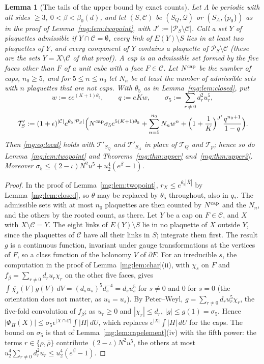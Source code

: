 \documentclass[11pt,a4paper]{article}
\newtheorem{lemma}[theorem]{Lemma}
\theoremstyle{definition}
\theoremstyle{remark}
\newcommand{\cP}{\mathcal{P}}
\newcommand{\dU}{\,dU}
\begin{document}
\begin{lemma}[The tails of the upper bound by exact counts]\label{mg:lem:uppertails}
Let $\Lambda$ be periodic with all sides $\ge3$, $0<\beta<\beta_0(d)$, and let $(S,\mathcal C)$ be $(S_Q,\mathcal Q)$ or $(S_A,\{p_0\})$ as in the proof of Lemma~\ref{mg:lem:twopoint}, with
$J':=|\cP_S\setminus\mathcal C|$. Call a set $Y$ of plaquettes \emph{admissible} if $Y\cap\mathcal C=\emptyset$, every link of $E(Y)\setminus S$ lies in at least two plaquettes of $Y$, and every
component of $Y$ contains a plaquette of $\cP_S\setminus\mathcal C$ (these are the sets $Y=X\setminus\mathcal C$ of that proof). A \emph{cap} is an admissible set formed by the five faces other
than $F$ of a unit cube with a face $F\in\mathcal C$. Let $N^{\rm cap}$ be the number of caps, $n_0\ge5$, and for $5\le n\le n_0$ let $N_n$ be at least the number of admissible sets
with $n$ plaquettes that are not caps. With $\theta_5$ as in Lemma~\ref{mg:lem:closed}, put
\[
w:=\epsilon e^{(K+1)\theta_5},\qquad q:=eKw,\qquad\sigma_5:=\sum_{r\ne0}d_r^2u_r^5,
\]
\[
\mathcal T'_S:=(1+\epsilon)^{|\mathcal C|}e^{\theta_5|\cP_S|}\Bigl(N^{\rm cap}\sigma_5e^{5(K+1)\theta_5}+\sum_{n=5}^{n_0}N_nw^n+\Bigl(1+\frac1K\Bigr)^{J'}\frac{q^{n_0+1}}{1-q}\Bigr).
\]
Then \eqref{mg:eq:local} holds with $\mathcal T'_{S_Q}$ and $\mathcal T'_{S_A}$ in place of $\mathcal T_Q$ and $\mathcal T_p$; hence so do Lemma~\ref{mg:lem:twopoint} and Theorems~\ref{mg:thm:upper}
and~\ref{mg:thm:upper2}. Moreover $\sigma_5\le(2-\iota)N^2u^5+u_2^4(e^\beta-1)$.
\end{lemma}

\begin{proof}
In the proof of Lemma~\ref{mg:lem:twopoint}, $r_X\le e^{\theta_5|\overline X|}$ by Lemma~\ref{mg:lem:closed}, so $\theta$ may be replaced by $\theta_5$ throughout, also in $q_*$. The admissible
sets with at most $n_0$ plaquettes are then counted by $N^{\rm cap}$ and the $N_n$, and the others by the rooted count, as there. Let $Y$ be a cap on $F\in\mathcal C$, and $X$ with
$X\setminus\mathcal C=Y$. The eight links of $E(Y)\setminus S$ lie in no plaquette of $X$ outside $Y$, since the plaquettes of $\mathcal C$ have all their links in $S$; integrate them
first. The result $g$ is a continuous function, invariant under gauge transformations at the vertices of $F$, so a class function of the holonomy $V$ of $\partial F$. For an
irreducible $s$, the computation in the proof of Lemma~\ref{mg:lem:char}(ii), with $\chi_s$ on $F$ and $f_\beta=\sum_{r\ne0}d_ru_r\chi_r$ on the other five faces, gives
$\int\overline{\chi_s}(V)g(V)\,dV=(d_su_s)^5d_s^{-4}=d_su_s^5$ for $s\ne0$ and $0$ for $s=0$ (the orientation does not matter, as $u_{\bar s}=u_s$). By Peter--Weyl,
$g=\sum_{r\ne0}d_ru_r^5\chi_r$, the five-fold convolution of $f_\beta$; as $u_r\ge0$ and $|\chi_r|\le d_r$, $|g|\le g(1)=\sigma_5$. Hence $|\Phi_H(X)|\le\sigma_5\epsilon^{|X\cap\mathcal C|}\int|H|\dU$, which replaces $\epsilon^{|X|}\int|H|\dU$ for the caps. The bound on $\sigma_5$ is that of
Lemma~\ref{mg:lem:capelement}(iv) with the fifth power: the terms $r\in\{\rho,\bar\rho\}$ contribute $(2-\iota)N^2u^5$, the others at most $u_2^4\sum_{r\ne0}d_r^2u_r\le u_2^4(e^\beta-1)$.
\end{proof}
\end{document}
